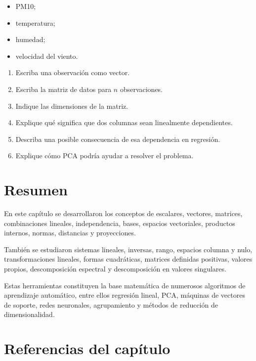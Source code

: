 \documentclass[
  spanish,
  10.5pt,
  letterpaper,
  DIV=11,
  numbers=noendperiod,
  oneside,
  open=any]{scrreprt}
\providecommand{\tightlist}{%
  \setlength{\itemsep}{0pt}\setlength{\parskip}{0pt}}
\theoremstyle{definition}
\theoremstyle{definition}
\theoremstyle{plain}
\theoremstyle{remark}
\begin{document}
\begin{itemize}
\tightlist
\item
  PM10;
\item
  temperatura;
\item
  humedad;
\item
  velocidad del viento.
\end{itemize}

\begin{enumerate}
\def\labelenumi{\arabic{enumi}.}
\tightlist
\item
  Escriba una observación como vector.
\item
  Escriba la matriz de datos para \(n\) observaciones.
\item
  Indique las dimensiones de la matriz.
\item
  Explique qué significa que dos columnas sean linealmente dependientes.
\item
  Describa una posible consecuencia de esa dependencia en regresión.
\item
  Explique cómo PCA podría ayudar a resolver el problema.
\end{enumerate}

\section*{Resumen}\label{resumen-1}


En este capítulo se desarrollaron los conceptos de escalares, vectores,
matrices, combinaciones lineales, independencia, bases, espacios
vectoriales, productos internos, normas, distancias y proyecciones.

También se estudiaron sistemas lineales, inversas, rango, espacios
columna y nulo, transformaciones lineales, formas cuadráticas, matrices
definidas positivas, valores propios, descomposición espectral y
descomposición en valores singulares.

Estas herramientas constituyen la base matemática de numerosos
algoritmos de aprendizaje automático, entre ellos regresión lineal, PCA,
máquinas de vectores de soporte, redes neuronales, agrupamiento y
métodos de reducción de dimensionalidad.

\section*{Referencias del capítulo}\label{referencias-del-capuxedtulo-1}
\end{document}
